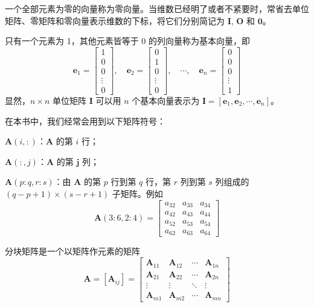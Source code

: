 \documentclass[punct=kaiming, fontset=fandol]{ctexbook}
\numberwithin{equation}{section}
\theoremstyle{mystyle}
\def\bf#1{\symbfit{#1}}
\def\bup#1{\symbfup{#1}}
\def\bf#1{\bm{#1}}
\def\bup#1{\bm{#1}}
\begin{document}
  一个全部元素为零的向量称为零向量。当维数已经明了或者不紧要时，常省去单位矩阵、零矩阵和零向量表示维数的下标，将它们分别简记为 $\bf{I}$, $\bf{O}$ 和 $\bup{0}$。

  只有一个元素为 1，其他元素皆等于 0 的列向量称为基本向量，即
  \begin{equation}
    \bf{e}_1 = \begin{bmatrix}
      1 \\ 0 \\ 0 \\ \vdots \\ 0
    \end{bmatrix},\quad
    \bf{e}_2 = \begin{bmatrix}
      0 \\ 1 \\ 0 \\ \vdots \\ 0
    \end{bmatrix},\quad
    \cdots,\quad
    \bf{e}_n = \begin{bmatrix}
      0 \\ 0 \\ 0 \\ \vdots \\ 1
    \end{bmatrix}
  \end{equation}
  显然，$n\times n$ 单位矩阵 $\bf{I}$ 可以用 $n$ 个基本向量表示为 $\bf{I} = [\bf e_1, \bf e_2, \cdots, \bf e_n]$。

  在本书中，我们经常会用到以下矩阵符号：

  $\bf A(i,:)$：$\bf A$ 的第 $i$ 行；

  $\bf A(:,j)$：$\bf A$ 的第 $\bf j$ 列；

  $\bf A(p:q, r:s)$：由 $\bf A$ 的第 $p$ 行到第 $q$ 行，第 $r$ 列到第 $s$ 列组成的 $(q-\allowbreak p+\allowbreak 1)\times(s-r+1)$ 子矩阵。例如
  \[ \bf A(3:6, 2:4) = \begin{bmatrix}
    a_{32} & a_{33} & a_{34} \\
    a_{42} & a_{43} & a_{44} \\
    a_{52} & a_{53} & a_{54} \\
    a_{62} & a_{63} & a_{64}
  \end{bmatrix} \]

  分块矩阵是一个以矩阵作元素的矩阵
  \[ \bf A = [\bf A_{ij}] = \begin{bmatrix}
    \bf A_{11}  & \bf A_{12}  & \cdots  & \bf A_{1n} \\
    \bf A_{21}  & \bf A_{22}  & \cdots  & \bf A_{2n} \\
    \vdots      & \vdots      & \ddots  & \vdots \\
    \bf A_{m1}  & \bf A_{m2}  & \cdots  & \bf A_{mn}
  \end{bmatrix} \]
\end{document}

